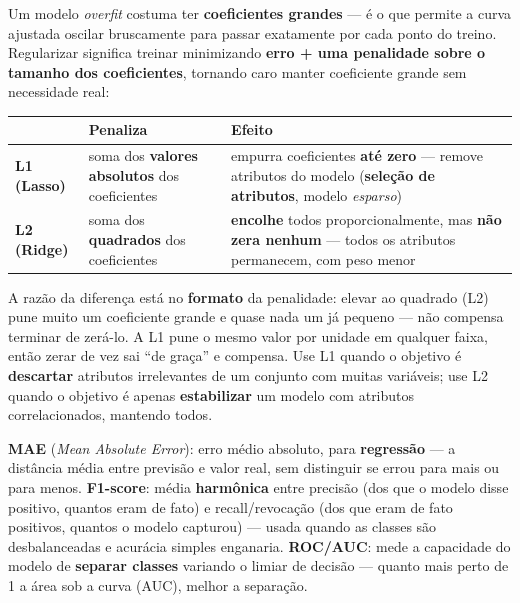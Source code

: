 \begin{conceito}
Um modelo \textit{overfit} costuma ter \textbf{coeficientes grandes} --- é
o que permite a curva ajustada oscilar bruscamente para passar exatamente
por cada ponto do treino. Regularizar significa treinar minimizando
\textbf{erro + uma penalidade sobre o tamanho dos coeficientes}, tornando
caro manter coeficiente grande sem necessidade real:

\begin{center}
\begin{tabular}{@{}p{2.4cm}p{3.6cm}p{5.4cm}@{}}
\toprule
& \textbf{Penaliza} & \textbf{Efeito} \\
\midrule
\textbf{L1 (Lasso)} & soma dos \textbf{valores absolutos} dos coeficientes
& empurra coeficientes \textbf{até zero} --- remove atributos do modelo
(\textbf{seleção de atributos}, modelo \textit{esparso}) \\
\textbf{L2 (Ridge)} & soma dos \textbf{quadrados} dos coeficientes &
\textbf{encolhe} todos proporcionalmente, mas \textbf{não zera nenhum} ---
todos os atributos permanecem, com peso menor \\
\bottomrule
\end{tabular}
\end{center}

A razão da diferença está no \textbf{formato} da penalidade: elevar ao
quadrado (L2) pune muito um coeficiente grande e quase nada um já pequeno
--- não compensa terminar de zerá-lo. A L1 pune o mesmo valor por unidade
em qualquer faixa, então zerar de vez sai “de graça” e compensa. Use L1
quando o objetivo é \textbf{descartar} atributos irrelevantes de um
conjunto com muitas variáveis; use L2 quando o objetivo é apenas
\textbf{estabilizar} um modelo com atributos correlacionados, mantendo
todos.
\end{conceito}

\begin{conceito}
\textbf{MAE} (\textit{Mean Absolute Error}): erro médio absoluto, para
\textbf{regressão} --- a distância média entre previsão e valor real, sem
distinguir se errou para mais ou para menos. \textbf{F1-score}: média
\textbf{harmônica} entre precisão (dos que o modelo disse positivo, quantos
eram de fato) e recall/revocação (dos que eram de fato positivos, quantos o
modelo capturou) --- usada quando as classes são desbalanceadas e acurácia
simples enganaria. \textbf{ROC/AUC}: mede a capacidade do modelo de
\textbf{separar classes} variando o limiar de decisão --- quanto mais perto
de 1 a área sob a curva (AUC), melhor a separação.
\end{conceito}

